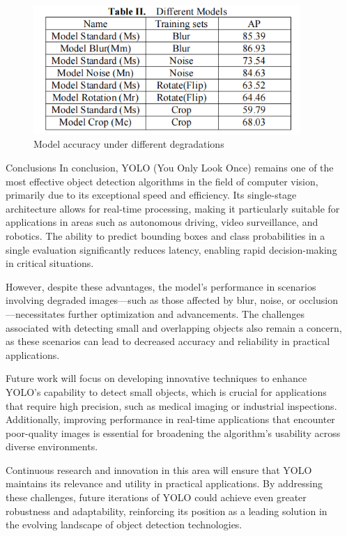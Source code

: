\documentclass[final]{beamer}
\newlength{\sepwidth}
\newlength{\colwidth}
\newcommand{\separatorcolumn}{\begin{column}{\sepwidth}\end{column}}
\begin{document}
\begin{frame}[t]
\begin{columns}[t]
\begin{column}{\colwidth}
  \begin{figure}
    \centering
    \includegraphics[width=0.95\textwidth]{logos/res_poster.png}
    \caption{Model accuracy under different degradations}
    \label{fig:results}
  \end{figure}
  
 \begin{block}{Conclusions}
    In conclusion, YOLO (You Only Look Once) remains one of the most effective object detection algorithms in the field of computer vision, primarily due to its exceptional speed and efficiency. Its single-stage architecture allows for real-time processing, making it particularly suitable for applications in areas such as autonomous driving, video surveillance, and robotics. The ability to predict bounding boxes and class probabilities in a single evaluation significantly reduces latency, enabling rapid decision-making in critical situations.

    However, despite these advantages, the model’s performance in scenarios involving degraded images—such as those affected by blur, noise, or occlusion—necessitates further optimization and advancements. The challenges associated with detecting small and overlapping objects also remain a concern, as these scenarios can lead to decreased accuracy and reliability in practical applications. 

    Future work will focus on developing innovative techniques to enhance YOLO's capability to detect small objects, which is crucial for applications that require high precision, such as medical imaging or industrial inspections. Additionally, improving performance in real-time applications that encounter poor-quality images is essential for broadening the algorithm's usability across diverse environments. 

    Continuous research and innovation in this area will ensure that YOLO maintains its relevance and utility in practical applications. By addressing these challenges, future iterations of YOLO could achieve even greater robustness and adaptability, reinforcing its position as a leading solution in the evolving landscape of object detection technologies.
\end{block}

  
\end{column}

\separatorcolumn
\end{columns}
\end{frame}
\end{document}
